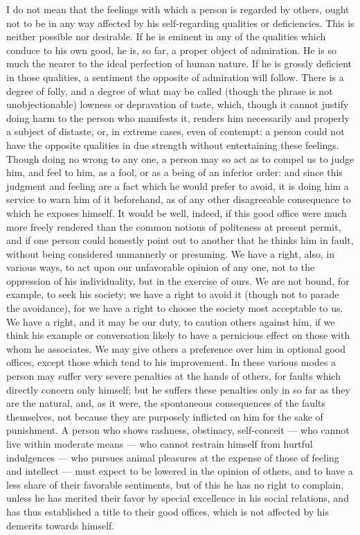\documentclass[12pt]{report}
\begin{document}
I do not mean that the feelings with which a person is regarded by others, ought not to be in any way affected by his self-regarding qualities or deficiencies. This is neither possible nor desirable. If he is eminent in any of the qualities which conduce to his own good, he is, so far, a proper object of admiration. He is so much the nearer to the ideal perfection of human nature. If he is grossly deficient in those qualities, a sentiment the opposite of admiration will follow. There is a degree of folly, and a degree of what may be called (though the phrase is not unobjectionable) lowness or depravation of taste, which, though it cannot justify doing harm to the person who manifests it, renders him necessarily and properly a subject of distaste, or, in extreme cases, even of contempt: a person could not have the opposite qualities in due strength without entertaining these feelings. Though doing no wrong to any one, a person may so act as to compel us to judge him, and feel to him, as a fool, or as a being of an inferior order: and since this judgment and feeling are a fact which he would prefer to avoid, it is doing him a service to warn him of it beforehand, as of any other disagreeable consequence to which he exposes himself. It would be well, indeed, if this good office were much more freely rendered than the common notions of politeness at present permit, and if one person could honestly point out to another that he thinks him in fault, without being considered unmannerly or presuming. We have a right, also, in various ways, to act upon our unfavorable opinion of any one, not to the oppression of his individuality, but in the exercise of ours. We are not bound, for example, to seek his society; we have a right to avoid it (though not to parade the avoidance), for we have a right to choose the society most acceptable to us. We have a right, and it may be our duty, to caution others against him, if we think his example or conversation likely to have a pernicious effect on those with whom he associates. We may give others a preference over him in optional good offices, except those which tend to his improvement. In these various modes a person may suffer very severe penalties at the hands of others, for faults which directly concern only himself; but he suffers these penalties only in so far as they are the natural, and, as it were, the spontaneous consequences of the faults themselves, not because they are purposely inflicted on him for the sake of punishment. A person who shows rashness, obstinacy, self-conceit — who cannot live within moderate means — who cannot restrain himself from hurtful indulgences — who pursues animal pleasures at the expense of those of feeling and intellect — must expect to be lowered in the opinion of others, and to have a less share of their favorable sentiments, but of this he has no right to complain, unless he has merited their favor by special excellence in his social relations, and has thus established a title to their good offices, which is not affected by his demerits towards himself.
\end{document}
